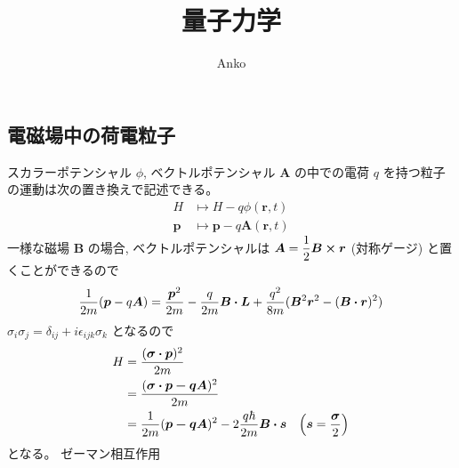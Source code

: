 \documentclass[uplatex,dvipdfmx,a4paper,11pt]{jlreq}
\title{量子力学}
\author{Anko}
\newcommand{\rr}{\bm{r}}
\theoremstyle{definition}
\begin{document}
\maketitle
\tableofcontents
\clearpage

\subsection{電磁場中の荷電粒子}
スカラーポテンシャル $\phi$, ベクトルポテンシャル $\bm{A}$ の中での電荷 $q$ を持つ粒子の運動は次の置き換えで記述できる。
\begin{align}
  H      & \mapsto H - q\phi(\rr, t)        \\
  \bm{p} & \mapsto \bm{p} - q\bm{A}(\rr, t)
\end{align}
一様な磁場 $\bm{B}$ の場合, ベクトルポテンシャルは $\bm{A} = \dfrac{1}{2}\bm{B}\cross\rr$ (対称ゲージ) と置くことができるので
\begin{align}
  \frac{1}{2m}(\bm{p} - q\bm{A}) = \frac{\bm{p}^2}{2m} - \frac{q}{2m}\bm{B}\vdot\bm{L} + \frac{q^2}{8m}(\bm{B}^2\rr^2 - (\bm{B}\vdot\rr)^2)
\end{align}
$\sigma_i\sigma_j = \delta_{ij} + i\epsilon_{ijk}\sigma_k$ となるので
\begin{align}
  H & = \frac{(\bm{\sigma}\vdot\bm{p})^2}{2m}                                                                         \\
    & = \frac{(\bm{\sigma}\vdot\bm{p - q\bm{A}})^2}{2m}                                                               \\
    & = \frac{1}{2m}(\bm{p - q\bm{A}})^2 - 2\frac{q\hbar}{2m}\bm{B}\vdot\bm{s} & \qty(\bm{s} = \frac{\bm{\sigma}}{2})
\end{align}
となる。
ゼーマン相互作用
\end{document}
